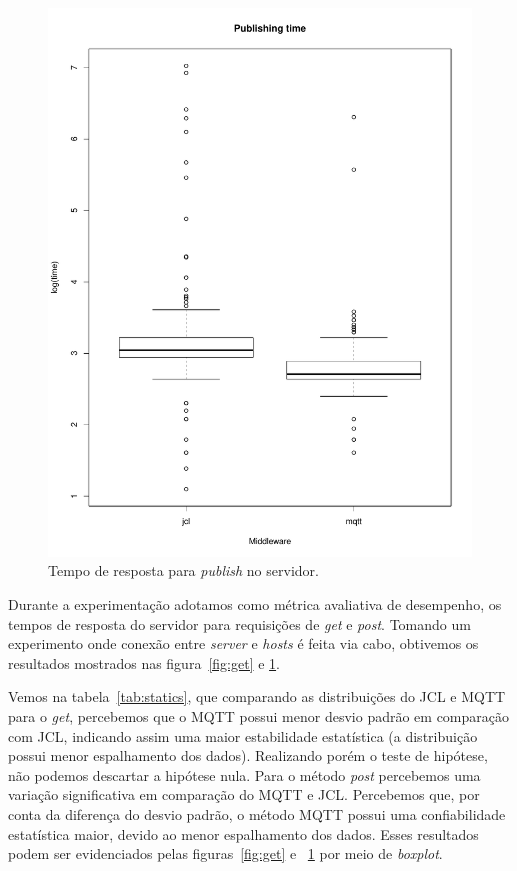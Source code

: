 \documentclass[12pt]{article}
\begin{document}
\begin{figure}
	\includegraphics[width=1\textwidth]{imgs/pub-time}
	\caption{Tempo de resposta para \textit{publish} no servidor.}
	\centering
	\label{fig:post}
\end{figure}

Durante a experimentação adotamos como métrica avaliativa de desempenho, os tempos de resposta do servidor para requisições de \textit{get} e \textit{post}. Tomando um experimento onde conexão entre \textit{server} e \textit{hosts} é feita via cabo, obtivemos os resultados mostrados nas figura~\ref{fig:get} e \ref{fig:post}.

Vemos na tabela~\ref{tab:statics}, que comparando as distribuições do JCL e MQTT para o \textit{get}, percebemos que o MQTT possui menor desvio padrão em comparação com JCL, indicando assim uma maior estabilidade estatística (a distribuição possui menor espalhamento dos dados). Realizando porém o teste de hipótese, não podemos descartar a hipótese nula. 
%
Para o método \textit{post} percebemos uma variação significativa em comparação do MQTT e JCL. Percebemos que, por conta da diferença do desvio padrão, o método MQTT possui uma confiabilidade estatística maior, devido ao menor espalhamento dos dados. Esses resultados podem ser evidenciados pelas figuras~\ref{fig:get} e ~\ref{fig:post} por meio de \textit{boxplot}.
\end{document}
